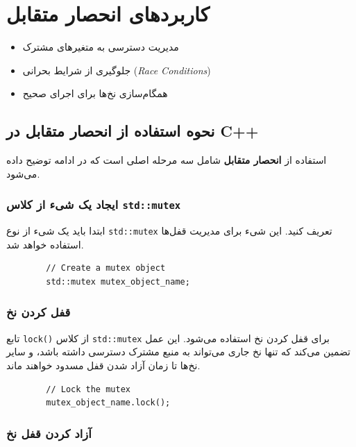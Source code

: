 \documentclass[12pt, a4paper]{report}
\begin{document}
\section{کاربردهای انحصار متقابل}
\begin{itemize}
	\item مدیریت دسترسی به متغیرهای مشترک
	\item جلوگیری از شرایط بحرانی (\textit{Race Conditions})
	\item همگام‌سازی نخ‌ها برای اجرای صحیح
\end{itemize}

\subsection{نحوه استفاده از انحصار متقابل در C++}

استفاده از \textbf{انحصار متقابل} شامل سه مرحله اصلی است که در ادامه توضیح داده می‌شود.

\subsubsection{ایجاد یک شیء از کلاس \texttt{std::mutex}}

ابتدا باید یک شیء از نوع \texttt{std::mutex} تعریف کنید. این شیء برای مدیریت قفل‌ها استفاده خواهد شد.

\begin{LTR}
	\begin{lstlisting}
		// Create a mutex object
		std::mutex mutex_object_name;
	\end{lstlisting}
\end{LTR}

\subsubsection{قفل کردن نخ}

تابع \texttt{lock()} از کلاس \texttt{std::mutex} برای قفل کردن نخ استفاده می‌شود. این عمل تضمین می‌کند که تنها نخ جاری می‌تواند به منبع مشترک دسترسی داشته باشد، و سایر نخ‌ها تا زمان آزاد شدن قفل مسدود خواهند ماند.

\begin{LTR}
	\begin{lstlisting}
		// Lock the mutex
		mutex_object_name.lock();
	\end{lstlisting}
\end{LTR}

\subsubsection{آزاد کردن قفل نخ}
\end{document}
